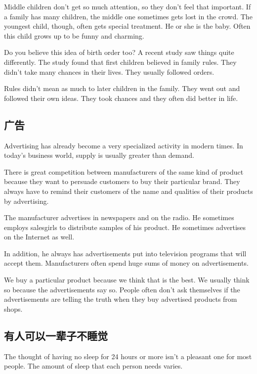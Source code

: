 Middle children don't get so much attention, so they
don't feel that important. If a family has many children, the
middle one sometimes gets lost in the crowd. The youngest
child, though, often gets special treatment. He or she is the
baby. Often this child grows up to be funny and charming.

Do you believe this idea of birth order too? A recent
study saw things quite differently. The study found that first
children believed in family rules. They didn't take many
chances in their lives. They usually followed orders.

Rules didn't mean as much to later children in the
family. They went out and followed their own ideas. They took chances and they often did better in life.
\subsection{广告}
\begin{margintable}\vspace{-2cm}\footnotesize
\end{margintable}
Advertising has already become a very specialized activity
in modern times. In today's business world, supply is
usually greater than demand.

There is great competition between manufacturers of the
same kind of product because they want to persuade
customers to buy their particular brand. They always
have to remind their customers of the name and qualities
of their products by advertising.

The manufacturer advertises in newspapers and on
the radio. He sometimes employs salesgirls to distribute
samples of his product. He sometimes advertises on the
Internet as well.

In addition, he always has advertisements put into television
programs that will accept them. Manufacturers often
spend huge sums of money on advertisements.

We buy a particular product because we think that is the
best. We usually think so because the advertisements say
so. People often don't ask themselves if the advertisements
are telling the truth when they buy advertised products
from shops.

\subsection{有人可以一辈子不睡觉}
\begin{margintable}\vspace{-2cm}\footnotesize
\end{margintable}
The thought of having no sleep for 24 hours or more isn't
a pleasant one for most people. The amount of sleep that
each person needs varies.

